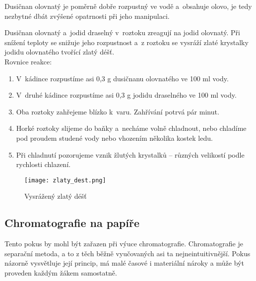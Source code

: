 \hspace{-21pt} 

Dusičnan olovnatý je poměrně dobře rozpustný ve vodě a~obsahuje olovo, je tedy nezbytné dbát zvýšené opatrnosti při jeho manipulaci.\\

\hspace{-21pt} 

Dusičnan olovnatý a~jodid draselný v~roztoku zreagují na jodid olovnatý. Při snížení teploty se snižuje jeho rozpustnost a~z roztoku se vysráží zlaté krystalky jodidu olovnatého tvořící zlatý déšť.\\

Rovnice reakce: \\

\hspace{-21pt} 

\begin{enumerate}
  \item V~kádince rozpustíme asi 0,3 g dusičnanu olovnatého ve 100 ml vody.
  \item V~druhé kádince rozpustíme asi 0,3 g jodidu draselného ve 100 ml vody.
  \item Oba roztoky zahřejeme blízko k~varu. Zahřívání potrvá pár minut.
  \item Horké roztoky slijeme do baňky a~necháme volně chladnout, nebo chladíme pod proudem studené vody nebo vhozením několika kostek ledu.
  \item Při chladnutí pozorujeme vznik žlutých krystalků -- různých velikostí podle rychlosti chlazení.
\end{enumerate}

\begin{figure}[h]
    \centering
    \texttt{[image: zlaty\_dest.png]}
    \caption{Vysrážený zlatý déšť}
\end{figure}

\subsection{Chromatografie na papíře}


Tento pokus by mohl být zařazen při výuce chromatografie. Chromatografie je separační metoda, a to z těch běžně vyučovaných asi ta nejneintuitivnější. Pokus názorně vysvětluje její princip, má malé časové i materiální nároky a může být proveden každým žákem samostatně.\\

